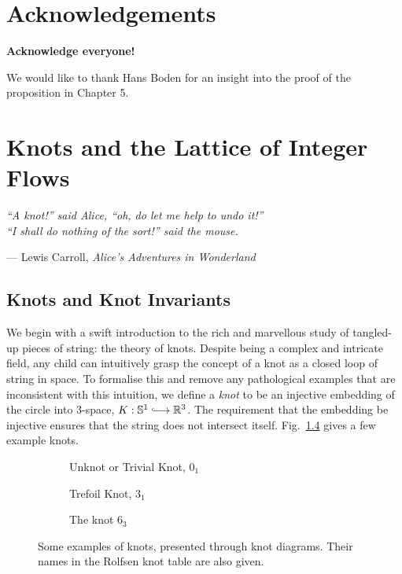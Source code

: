 \documentclass[12pt]{report}
\newcommand{\R}{\mathbb{R}}
\renewcommand{\S}{\mathbb{S}}
\newcommand{\inject}{\lhook\joinrel\longrightarrow}
\newcommand{\notered}[1]{{\color{Red} \textbf{#1}}}
\theoremstyle{upright}
\begin{document}
\chapter*{Acknowledgements}

\notered{Acknowledge everyone!}

We would like to thank Hans Boden for an insight into the proof of the proposition in Chapter 5.


\chapter{Knots and the Lattice of Integer Flows}
\epigraph{\itshape ``A knot!'' said Alice, ``oh, do let me help to undo it!''\\``I shall do nothing of the sort!'' said the mouse.}{--- Lewis Carroll, \textit{Alice's Adventures in Wonderland}}

\section{Knots and Knot Invariants}

We begin with a swift introduction to the rich and marvellous study of tangled-up pieces of string: the theory of knots. Despite being a complex and intricate field, any child can intuitively grasp the concept of a knot as a closed loop of string in space. To formalise this and remove any pathological examples that are inconsistent with this intuition, we define a \textit{knot} to be an injective embedding of the circle into $3$-space, $K: \S^{1} \inject \R^{3}$. The requirement that the embedding be injective ensures that the string does not intersect itself. Fig.~\ref{fig:knot-examples} gives a few example knots.

\begin{figure}[hbt!]
	\centering
	\hspace*{\fill}
	\begin{subfigure}[b]{0.3 \textwidth}
		\centering
		\def\svgscale{0.2}
		
		\caption{Unknot or Trivial Knot, $0_{1}$}
		\label{fig:unknot}
	\end{subfigure}
	\hspace*{\fill}
	\begin{subfigure}[b]{0.3 \textwidth}
		\centering
		\def\svgscale{0.2}
		
		\caption{Trefoil Knot, $3_{1}$}
		\label{fig:trefoil}
	\end{subfigure}
	\hspace*{\fill}
	\begin{subfigure}[b]{0.3 \textwidth}
		\centering
		\def\svgscale{0.2}
		
		\caption{The knot $6_{3}$}
		\label{fig:6-3-knot}
	\end{subfigure}
	\caption{Some examples of knots, presented through knot diagrams. Their names in the Rolfsen knot table are also given.}
	\label{fig:knot-examples}
	\hspace*{\fill} 
\end{figure}
\end{document}
